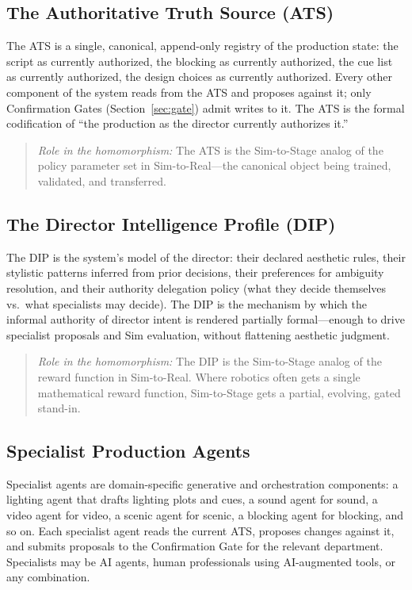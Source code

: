 \documentclass[11pt]{article}
\begin{document}
\subsection{The Authoritative Truth Source (ATS)}
\label{sec:ats}

The ATS is a single, canonical, append-only registry of the production
state: the script as currently authorized, the blocking as currently
authorized, the cue list as currently authorized, the design choices as
currently authorized.  Every other component of the system reads from the
ATS and proposes against it; only Confirmation Gates
(Section~\ref{sec:gate}) admit writes to it.  The ATS is the formal
codification of ``the production as the director currently authorizes it.''

\begin{quote}
\textit{Role in the homomorphism:} The ATS is the Sim-to-Stage analog of
the policy parameter set in Sim-to-Real---the canonical object being
trained, validated, and transferred.
\end{quote}

\subsection{The Director Intelligence Profile (DIP)}
\label{sec:dip}

The DIP is the system's model of the director: their declared aesthetic
rules, their stylistic patterns inferred from prior decisions, their
preferences for ambiguity resolution, and their authority delegation policy
(what they decide themselves vs.\ what specialists may decide).  The DIP
is the mechanism by which the informal authority of director intent is
rendered partially formal---enough to drive specialist proposals and Sim
evaluation, without flattening aesthetic judgment.

\begin{quote}
\textit{Role in the homomorphism:} The DIP is the Sim-to-Stage analog of
the reward function in Sim-to-Real.  Where robotics often gets a single
mathematical reward function, Sim-to-Stage gets a partial, evolving,
gated stand-in.
\end{quote}

\subsection{Specialist Production Agents}
\label{sec:specialists}

Specialist agents are domain-specific generative and orchestration
components: a lighting agent that drafts lighting plots and cues, a sound
agent for sound, a video agent for video, a scenic agent for scenic, a
blocking agent for blocking, and so on.  Each specialist agent reads the
current ATS, proposes changes against it, and submits proposals to the
Confirmation Gate for the relevant department.  Specialists may be AI
agents, human professionals using AI-augmented tools, or any combination.
\end{document}
